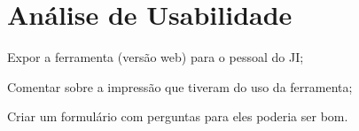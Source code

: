 \chapter{Análise de Usabilidade~\label{chp:Análise-de-Usabilidade}}

\begin{todolist}
    \item Expor a ferramenta (versão web) para o pessoal do JI;
    \item Comentar sobre a impressão que tiveram do uso da ferramenta;
    \item Criar um formulário com perguntas para eles poderia ser bom.
\end{todolist}
